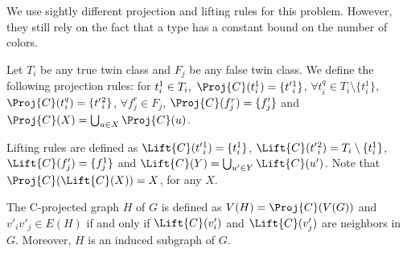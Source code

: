 We use sightly different projection and lifting rules for this problem.
However, they still rely on the fact that a type has a constant bound on the number of colors.

\begin{definition}
    Let $T_i$ be any true twin class and $F_j$ be any false twin class.
    We define the following projection rules:
    for $t_i^1 \in T_i,\ \Proj{C}(t_i^1) = \{t'{_i^1}\}$,
    $\forall t_i^q \in T_i \setminus \{t_i^1\}$, $\Proj{C}(t_i^q) = \{t'{_i^2}\}$,
    $\forall f_j^r \in F_j$, $\Proj{C}(f_j^r) = \{f'_j\}$
    and $\Proj{C}(X) = \bigcup_{u \in X} \Proj{C}(u)$.
    
    Lifting rules are defined as $\Lift{C}(t'{_i^1}) = \{t_i^1\}$,
    $\Lift{C}(t'{_i^2}) = T_i \setminus \{t_i^1\}$,
    $\Lift{C}(f'_j) = \{f_j^1\}$ and $\Lift{C}(Y) = \bigcup_{u' \in Y} \Lift{C}(u')$. Note that $\Proj{C}(\Lift{C}(X)) = X$, for any $X$.
\end{definition}

\begin{definition}
    The C-projected graph $H$ of $G$ is defined as $V(H) = \Proj{C}(V(G))$ and $v'_iv'_j \in E(H)$ if and only if $\Lift{C}(v'_i)$ and $\Lift{C}(v'_j)$ are neighbors in $G$. Moreover, $H$ is an induced subgraph of $G$.
\end{definition}


